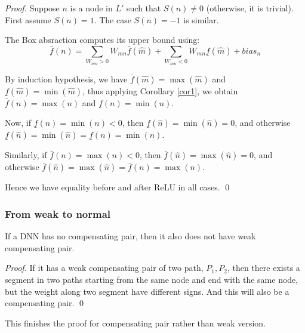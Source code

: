 	\begin{proof}
		Suppose $n$ is a node in $L'$ such that $S(n)\neq 0$ (otherwise, it is trivial). 
		First assume $S(n)=1$. The case $S(n)=-1$ is similar. 
		
		The Box absraction computes its upper bound using:
		$$\bar{f}(n)= \sum_{W_{mn}>0} W_{mn} \bar{f}(\hat{m}) + \sum_{W_{mn}<0} W_{mn} \underline{f}(\hat{m}) + bias_n$$
		
		By induction hypothesis, we have 
		$\bar{f}(\hat{m})=\max(\hat{m})$ and
		$\underline{f}(\hat{m})=\min(\hat{m})$, thus 
		applying Corollary \ref{cor1}, we obtain
		$\bar{f}(n)=\max(n)$ and 
		$\underline{f}(n)=\min(n)$.
		
		Now, if $\underline{f}(n)=\min(n)<0$, 
		then $\underline{f}(\hat{n})=\min(\hat{n})=0$, 
		and otherwise 
		$\underline{f}(\hat{n})=\min(\hat{n})=\underline{f}(n)=\min(n)$.
		
		Similarly, 
		if $\bar{f}(n)=\max(n)<0$, 
		then $\bar{f}(\hat{n})=\max(\hat{n})=0$, 
		and otherwise 
		$\bar{f}(\hat{n})=\max(\hat{n})=\bar{f}(n)=\max(n)$.
		
		Hence we have equality before and after ReLU in all cases. \qed
	\end{proof}
	
	
	
	\subsubsection*{From weak to normal}
	
	\begin{lemma}
		If a DNN has no compensating pair, then it also does not have weak compensating pair.
	\end{lemma}
	
	\begin{proof}
		If it has a weak compensating pair of two path, $P_1,P_2$, then there exists a segment in two paths starting from the same node and end with the same node, but the weight along two segment have different signs. And this will also be a compensating pair. \qed
	\end{proof}
	
	This finishes the proof for compensating pair rather than weak version.
	
